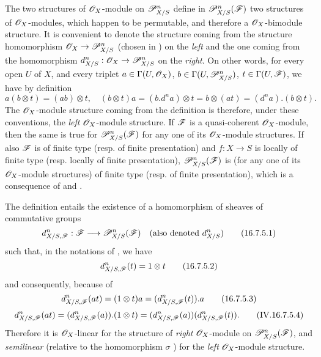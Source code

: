 \begin{env}[16.7.4]
\label{IV.16.7.4}
The two structures of $\mathscr{O}_X$-module on $\mathscr{P}_{X/S}^n$ define in $\mathscr{P}_{X/S}^n(\mathscr{F})$ two structures of $\mathscr{O}_X$-modules, which happen to be permutable, and therefore a $\mathscr{O}_X$-bimodule structure.
It is convenient to denote the structure coming from the structure homomorphism $\sh{O}_X \to \sh{P}_{X/S}^n$ (chosen in ) on the \emph{left} and the one coming from the homomorphism $d_{X/S}^n: \sh{O}_X \to \sh{P}_{X/S}^n$ on the \emph{right}.
On other words, for every open $U$ of $X$, and every triplet $a \in \Gamma(U, \mathscr{O}_X)$, $b \in \Gamma(U, \mathscr{P}_{X/S}^n)$, $t \in \Gamma(U, \mathscr{F})$, we have by definition
\[
  \label{IV.16.7.4.1}
  a(b \otimes t) = (ab) \otimes t, \quad (b \otimes t)a = (b.d^n a) \otimes t = b \otimes (at) = (d^na).(b \otimes t).
  \tag{16.7.4.1}
\]
The $\mathscr{O}_X$-module structure coming from the definition  is therefore, under these conventions, the \emph{left} $\mathscr{O}_X$-module structure.
If $\mathscr{F}$ is a quasi-coherent $\mathscr{O}_X$-module, then the same is true for $\mathscr{P}_{X/S}^n(\mathscr{F})$ for any one of its $\mathscr{O}_X$-module structures.
If also $\mathscr{F}$ is of finite type (resp. of finite presentation) and $f:X \to S$ is locally of finite type (resp. locally of finite presentation), $\mathscr{P}_{X/S}^n(\mathscr{F})$ is (for any one of its $\mathscr{O}_X$-module structures) of finite type (resp. of finite presentation), which is a consequence of  and .
\end{env}

\begin{env}[16.7.5]
\label{IV.16.7.5}
The definition  entails the existence of a homomorphism of sheaves of commutative groups
\[
  \label{IV.16.7.5.1}
  d_{X/S, \sh{F}}^n: \sh{F} \to \sh{P}_{X/S}^n(\sh{F}) \quad (\text{also denoted } d_{X/S}^n)
  \tag{16.7.5.1}
\]
such that, in the notations of , we have
\[
  \label{IV.16.7.5.2}
  d_{X/S, \mathscr{F}}^n(t) = 1 \otimes t
  \tag{16.7.5.2}
\]
and consequently, because of 
\[
  \label{IV.16.7.5.3}
  d_{X/S, \mathscr{F}}^n(at) = (1 \otimes t) a = (d_{X/S, \mathscr{F}}^n(t)).a
  \tag{16.7.5.3}
\]
\[
  \label{IV.IV.16.7.5.4}
  d_{X/S, \mathscr{F}}^n(at) = (d_{X/S, \mathscr{F}}^n(a)).(1 \otimes t) = (d_{X/S, \mathscr{F}}^n(a))(d_{X/S, \mathscr{F}}^n(t)).
  \tag{IV.16.7.5.4}
\]
Therefore it is $\mathscr{O}_X$-linear for the structure of \emph{right} $\mathscr{O}_X$-module on $\mathscr{P}_{X/S}^n(\mathscr{F})$, and \emph{semilinear} (relative to the homomorphism $\sigma$ ) for the \emph{left} $\mathscr{O}_X$-module structure.
\end{env}

